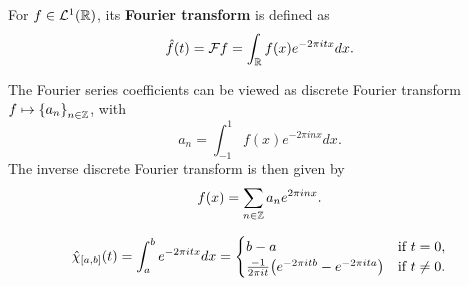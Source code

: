 \begin{definition}
    For $f\in\mathcal{L}^1(\mathbb{R})$, its \textbf{Fourier transform} is defined as 
    \begin{equation}
        \hat{f}(t) = \mathcal{F} f = \int_{\mathbb{R}} f(x)e^{-2\pi itx}dx.
    \end{equation}
\end{definition}
\begin{remark}
    The Fourier series coefficients can be viewed as discrete Fourier transform 
    $f\mapsto \left\{ {a_n} \right\}_{n\in\mathbb{Z}}$, with 
    \begin{equation}
        a_n = \int_{-1}^{1}f(x)e^{-2\pi inx}dx.
    \end{equation}
    The inverse discrete Fourier transform is then given by 
    \begin{equation}
        f(x) = \sum_{n\in\mathbb{Z}}a_ne^{2\pi inx}.
    \end{equation}
\end{remark}

\begin{example}
    \begin{equation*}
        \hat{\chi}_{[a,b]}(t) = \int_{a}^{b}e^{-2\pi itx}dx 
        = \begin{cases}
            b-a & \text{if }t=0, \\
            \frac{-1}{2\pi it}\pth{e^{-2\pi itb} - e^{-2\pi ita}} & \text{if }t\neq 0.
        \end{cases} 
    \end{equation*}    
\end{example} 

